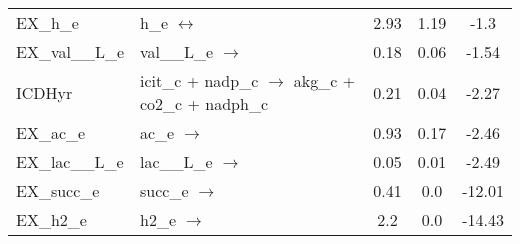 \begin{tabular}{lp{}ccc}
EX\_h\_e	&	h\_e $\leftrightarrow$ 	&	2.93	&	1.19	&	-1.3	\\
EX\_val\_\_L\_e	&	val\_\_L\_e $\rightarrow$ 	&	0.18	&	0.06	&	-1.54	\\
ICDHyr	&	icit\_c + nadp\_c $\rightarrow$ akg\_c + co2\_c + nadph\_c	&	0.21	&	0.04	&	-2.27	\\
EX\_ac\_e	&	ac\_e $\rightarrow$ 	&	0.93	&	0.17	&	-2.46	\\
EX\_lac\_\_L\_e	&	lac\_\_L\_e $\rightarrow$ 	&	0.05	&	0.01	&	-2.49	\\
EX\_succ\_e	&	succ\_e $\rightarrow$ 	&	0.41	&	0.0	&	-12.01	\\
EX\_h2\_e	&	h2\_e $\rightarrow$ 	&	2.2	&	0.0	&	-14.43	\\
\end{tabular}
